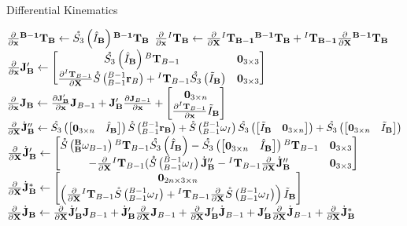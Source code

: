 \begin{algorithm}[H]
	\caption{Differential Kinematics}\label{alg:diff_kinematics}
	\begin{algorithmic}
		\State $\partialx{}{^{\mathbf{B - 1}}\T_\B} \gets \Sn{\IHat_\B}{^{\mathbf{B - 1}}\T_\B}$
		\State $\partialx{}{^I\T_\B} \gets \partialX{}{^I\T_\mathbf{B - 1}}{{^{\mathbf{B - 1}}\T_\B}} + {^I\T_\mathbf{B - 1}}\partialX{}{^{\mathbf{B - 1}}\T_\B}$
		\State $\partialx{}\J_\B' \gets
		\begin{bmatrix}
			\Sn{\IHat_\B}{^B}\T_{B-1}                                                                      & \ZERO_{3 \times 3} \\
			\frac{\partial{^I\T_{B-1}}}{\partial \X} \S{^{B-1}_{B-1}\r_{B}} +  {^I\T_{B-1}}\Sn{\ITilde_\B} & \ZERO_{3 \times 3} 
		\end{bmatrix} $
		\State $\partialx{}\J_\B \gets \frac{\partial \J_\B'}{\partial\x}\J_{B-1} + \J_\B' \frac{\partial\J_{B-1}}{\partial\x} + \begin{bmatrix} 
		{\ZERO_{3 \times n}} \\
		{\partialx{^I\T_{B-1}}\ITilde_\B} \\
		\end{bmatrix}  \label{eqn:d_jacob}$
		\State $\partialX{}\dotJ_\B'' \gets \Sn{\begin{bmatrix} \ZERO_{3 \times n} & \IHat_\B \end{bmatrix}}\S{^{B-1}_{B-1}\r_\B} + \S{^{B-1}_{B-1}\omega_I}\Sn{\begin{bmatrix} \ITilde_\B & \ZERO_{3 \times n} \end{bmatrix}}\nonumber + \Sn{\begin{bmatrix} \ZERO_{3 \times n} & \ITilde_\B \end{bmatrix}}$
		\State $\partialX{}\dotJ_\B' \gets \begin{bmatrix}  
		\S{\BB\omega_{B-1}}{^B\T_{B-1}}\Sn{\IHat_\B} - \Sn{\begin{bmatrix}
			\ZERO_{3 \times n} & \IHat_\B
			\end{bmatrix}}{^B\T_{B-1}}                                     & \ZERO_{3 \times 3} \\
		-\partialX{} {^I\T_{B-1}} (\S{^{B-1}_{B-1}\omega_I}\dotJ_\B''  - {^I\T_{B-1}}
		\partialX{}\dotJ_\B''  & \ZERO_{3 \times 3} \\
		\end{bmatrix} $
		\State $\partialX{} \dotJ_\B^* \gets \begin{bmatrix} 
		\ZERO_{2n \times 3 \times n} \\
		\left ( \partialX{}{^I{\T}_{B-1}}\S{^{B-1}_{B-1}\omega_I} + {^I{\T}_{B-1}}\partialX{}\S{^{B-1}_{B-1}\omega_I} \right ) \ITilde_\B \\
		\end{bmatrix} $
		\State $\partialX{} \dotJ_\B \gets \partialX{}\dotJ_\B' \J_{B-1} + \dotJ_\B' \partialX{}\J_{B-1} + \partialX{}\J_\B' \dotJ_{B-1} + \J_\B' \partialX{} \dotJ_{B-1} + \partialX{} \dotJ_\B^*$
	\end{algorithmic}
\end{algorithm}

